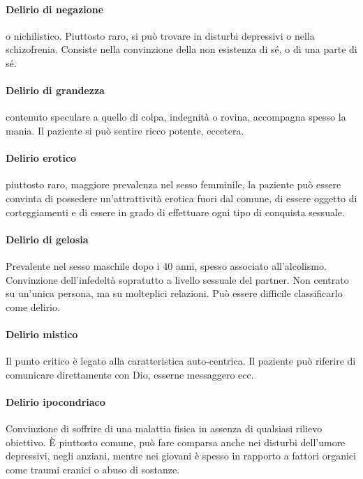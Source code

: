 {\paragraph{Delirio di negazione}  o nichilistico. Piuttosto raro, si può trovare in disturbi depressivi o nella schizofrenia. Consiste nella convinzione della non esistenza di sé, o di una parte di sé.

\paragraph{Delirio di grandezza} contenuto speculare a quello di colpa, indegnità o rovina, accompagna spesso la mania. Il paziente si può sentire ricco potente, eccetera.

\paragraph{Delirio erotico}  piuttosto raro, maggiore prevalenza nel sesso femminile, la paziente può essere convinta di possedere un'attrattività erotica fuori dal comune, di essere oggetto di corteggiamenti e di essere in grado di effettuare ogni tipo di conquista sessuale.

\paragraph{Delirio di gelosia}  Prevalente nel sesso maschile dopo i 40 anni, spesso associato all'alcolismo. Convinzione dell'infedeltà sopratutto a livello sessuale del partner. Non centrato su un'unica persona, ma su molteplici relazioni. Può essere difficile classificarlo come delirio.

\paragraph{Delirio mistico}  Il punto critico è legato alla caratteristica auto-centrica. Il paziente può riferire di comunicare direttamente con Dio, esserne messaggero ecc.

\paragraph{Delirio ipocondriaco} Convinzione di soffrire di una malattia fisica in assenza di qualsiasi rilievo obiettivo. È piuttosto comune, può fare comparsa anche nei disturbi dell'umore depressivi, negli anziani, mentre nei giovani è spesso in rapporto a fattori organici come traumi cranici o abuso di sostanze.

}
